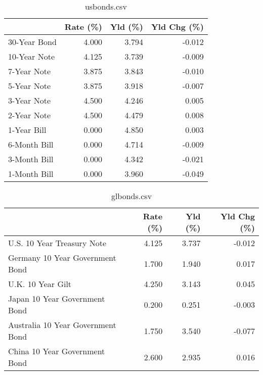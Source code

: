 \documentclass{article}%
\begin{document}
%


\begin{table}[htbp]%
\caption{usbonds.csv}%
\centering%
\begin{adjustbox}{width=1\textwidth}%
\begin{tabular}{lrrr}
\toprule
             &  Rate (\%) &  Yld (\%) &  Yld Chg (\%) \\
\midrule
30-Year Bond &     4.000 &    3.794 &       -0.012 \\
10-Year Note &     4.125 &    3.739 &       -0.009 \\
 7-Year Note &     3.875 &    3.843 &       -0.010 \\
 5-Year Note &     3.875 &    3.918 &       -0.007 \\
 3-Year Note &     4.500 &    4.246 &        0.005 \\
 2-Year Note &     4.500 &    4.479 &        0.008 \\
 1-Year Bill &     0.000 &    4.850 &        0.003 \\
6-Month Bill &     0.000 &    4.714 &       -0.009 \\
3-Month Bill &     0.000 &    4.342 &       -0.021 \\
1-Month Bill &     0.000 &    3.960 &       -0.049 \\
\bottomrule
\end{tabular}
%
\end{adjustbox}%
\end{table}

%


\begin{table}[htbp]%
\caption{glbonds.csv}%
\centering%
\begin{adjustbox}{width=1\textwidth}%
\begin{tabular}{lrrr}
\toprule
                                  &  Rate (\%) &  Yld (\%) &  Yld Chg (\%) \\
\midrule
       U.S. 10 Year Treasury Note &     4.125 &    3.737 &       -0.012 \\
  Germany 10 Year Government Bond &     1.700 &    1.940 &        0.017 \\
                U.K. 10 Year Gilt &     4.250 &    3.143 &        0.045 \\
    Japan 10 Year Government Bond &     0.200 &    0.251 &       -0.003 \\
Australia 10 Year Government Bond &     1.750 &    3.540 &       -0.077 \\
    China 10 Year Government Bond &     2.600 &    2.935 &        0.016 \\
\bottomrule
\end{tabular}
%
\end{adjustbox}%
\end{table}
\end{document}
